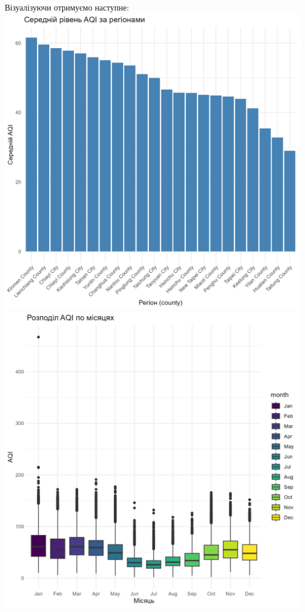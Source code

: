 \documentclass[./report.tex]{subfiles}
\begin{document}
\begin{enumerate}
  Візуалізуючи отримуємо наступне:
  \includegraphics[width=6in]{plots/question4/avg_aqi_by_country.png}
  \includegraphics[width=6in]{plots/question4/seasonal_change.png}
    

\end{enumerate}
\end{document}
